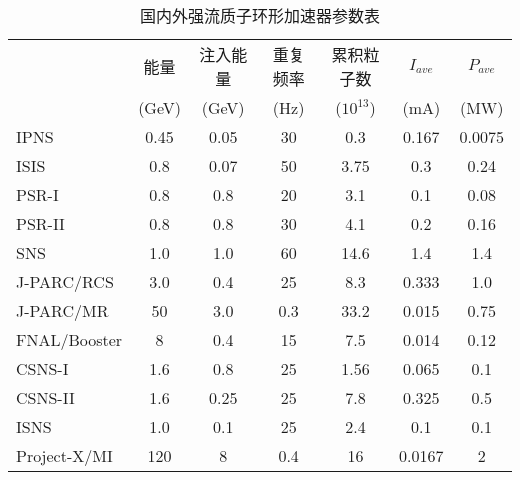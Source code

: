 \begin{table}[!htb]
  \centering
  \caption{国内外强流质子环形加速器参数表}
  \begin{tabular}{|>{\small}l|c|c|c|c|c|c|}
    \hline
                &能量       &注入能量   &重复频率      &累积粒子数    &$I_{ave}$ &$P_{ave}$ \\
                &(GeV)  &(GeV)  &(Hz)       &($10^{13}$)  &(mA)      &(MW)      \\
    \hline
    IPNS        &0.45   &0.05    &30        &0.3      &0.167     &0.0075    \\
    ISIS        &0.8    &0.07    &50        &3.75     &0.3       &0.24      \\
    PSR-I       &0.8    &0.8     &20        &3.1      &0.1       &0.08      \\
    PSR-II      &0.8    &0.8     &30        &4.1      &0.2       &0.16      \\
    SNS         &1.0    &1.0     &60        &14.6     &1.4       &1.4       \\
    J-PARC/RCS  &3.0    &0.4     &25        &8.3      &0.333     &1.0       \\
    J-PARC/MR   &50     &3.0     &0.3       &33.2     &0.015     &0.75      \\
    FNAL/Booster&8      &0.4     &15        &7.5      &0.014     &0.12      \\
    CSNS-I      &1.6    &0.8     &25        &1.56     &0.065     &0.1       \\
    CSNS-II     &1.6    &0.25    &25        &7.8      &0.325     &0.5       \\
    ISNS        &1.0    &0.1     &25        &2.4      &0.1       &0.1       \\
    Project-X/MI&120    &8       &0.4       &16       &0.0167    &2         \\
    \hline
  \end{tabular}
  \label{tab:proton_ring}
\end{table}




